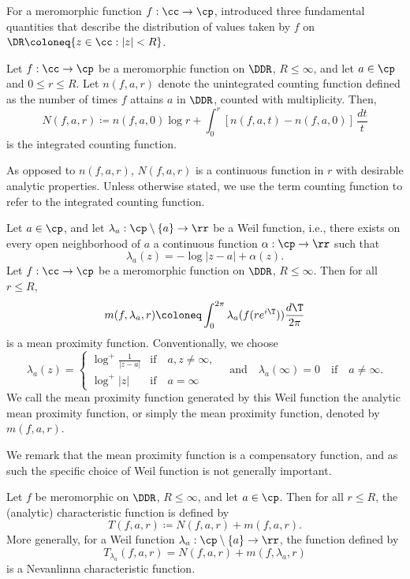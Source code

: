 \documentclass{amsart}
\begin{document}
For a meromorphic function $f:\cc\to\cp$, \cite{Nevanlinna1925} introduced three fundamental quantities that describe the distribution of values taken by $f$ on $\DR\coloneq \{z\in\cc : |z|<R\}$. 

\begin{defin}\label{claIntCou}
    Let $f:\cc\to\cp$ be a meromorphic function on $\DDR$, $R\leq\infty$, and let $a\in\cp$ and $0\leq r\leq R$. Let $n(f,a,r)$ denote the unintegrated counting function defined as the number of times $f$ attains $a$ in $\DDR$, counted with multiplicity. Then, \[N(f,a,r)\coloneq n(f,a,0)\log r+ \int_0^r [n(f,a,t)-n(f,a,0)]\,\frac{dt}{t}\] is the integrated counting function.   
\end{defin}

As opposed to $n(f,a,r)$, $N(f,a,r)$ is a continuous function in $r$ with desirable analytic properties. Unless otherwise stated, we use the term counting function to refer to the integrated counting function. 

\begin{defin}
    Let $a\in\cp$, and let $\lambda_a:\cp\setminus\{a\}\to\rr$ be a Weil function, i.e., there exists on every open neighborhood of $a$ a continuous function $\alpha:\cp\to\rr$ such that \[\lambda_a(z)=-\log|z-a|+\alpha(z).\] Let $f:\cc\to\cp$ be a meromorphic function on $\DDR$, $R\leq\infty$. Then for all $r\leq R$, \[m(f,\lambda_a,r)\coloneq\int_0^{2\pi}\lambda_a(f(re^{i\T}))\frac{d\T}{2\pi}\] is a mean proximity function. Conventionally, we choose \[\lambda_a(z)=\begin{cases}
        \log^+\frac1{|z-a|}  &\text{if} \quad  a,z\neq \infty, \\\log^+ |z| &\text{if} \quad a=\infty 
    \end{cases} \quad \text{and} \quad \lambda_a(\infty)=0 \quad \text{if} \quad a\neq\infty.\] We call the mean proximity function generated by this Weil function the analytic mean proximity function, or simply the mean proximity function, denoted by $m(f,a,r)$. 
\end{defin}

We remark that the mean proximity function is a compensatory function, and as such the specific choice of Weil function is not generally important.  

\begin{defin}
    Let $f$ be meromorphic on $\DDR$, $R\leq\infty$, and let $a\in\cp$. Then for all $r\leq R$, the (analytic) characteristic function is defined by \[T(f,a,r)\coloneq N(f,a,r)+m(f,a,r).\] More generally, for a Weil function $\lambda_a:\cp\setminus\{a\}\to\rr$, the function defined by \[T_{\lambda_a}(f,a,r)=N(f,a,r)+m(f,\lambda_a,r)\] is a Nevanlinna characteristic function. 
\end{defin}
\end{document}
